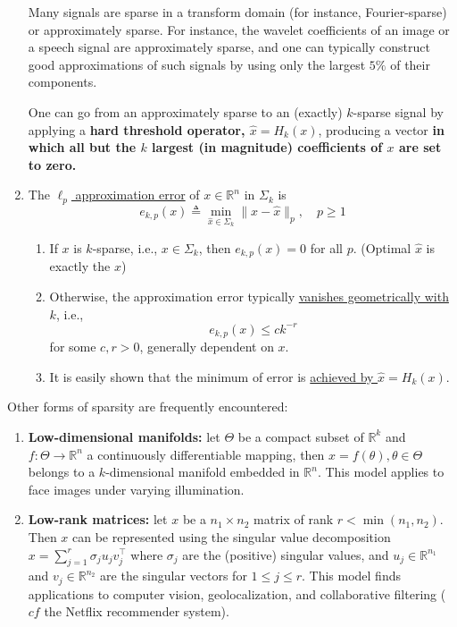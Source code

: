 \documentclass[11pt]{elegantbook}
\begin{document}
\begin{enumerate}
    Many signals are sparse in a transform domain (for instance, Fourier-sparse) or approximately sparse. For instance, the wavelet coefficients of an image or a speech signal are approximately sparse, and one can typically construct good approximations of such signals by using only the largest $5 \%$ of their components.
    \begin{claim}
        One can go from an approximately sparse to an (exactly) $k$-sparse signal by applying a \textbf{hard threshold operator, $\hat{x}=H_k(x)$}, producing a vector \textbf{in which all but the $k$ largest (in magnitude) coefficients of $x$ are set to zero.}
    \end{claim}
    \item 
    \begin{definition}
        The \underline{$\ell_p$ approximation error} of $x \in \mathbb{R}^n$ in $\Sigma_k$ is
        $$
        e_{k, p}(x) \triangleq \min _{\hat{x} \in \Sigma_k}\|x-\hat{x}\|_p, \quad p \geq 1
        $$
    \end{definition}
    \begin{lemma}[Properties]
    \begin{enumerate}
        \item If $x$ is $k$-sparse, i.e., $x \in \Sigma_k$, then $e_{k, p}(x)=0$ for all $p$. (Optimal $\hat{x}$ is exactly the $x$)
        \item Otherwise, the approximation error typically \underline{vanishes geometrically with $k$}, i.e.,
        $$
        e_{k, p}(x) \leq c k^{-r}
        $$
        for some $c, r>0$, generally dependent on $x$.
        \item It is easily shown that the minimum of error is \underline{achieved by $\hat{x}=H_k(x)$}.
    \end{enumerate}
    \end{lemma}
\end{enumerate}

Other forms of sparsity are frequently encountered:
\begin{enumerate}[$\bullet$]
    \item \textbf{Low-dimensional manifolds:} let $\Theta$ be a compact subset of $\mathbb{R}^k$ and $f: \Theta \rightarrow \mathbb{R}^n$ a continuously differentiable mapping, then $x=f(\theta), \theta \in \Theta$ belongs to a $k$-dimensional manifold embedded in $\mathbb{R}^n$. This model applies to face images under varying illumination.
    \item \textbf{Low-rank matrices:} let $x$ be a $n_1 \times n_2$ matrix of rank $r<\min \left(n_1, n_2\right)$. Then $x$ can be represented using the singular value decomposition $x=\sum_{j=1}^r \sigma_j u_j v_j^{\top}$ where $\sigma_j$ are the (positive) singular values, and $u_j \in \mathbb{R}^{n_1}$ and $v_j \in \mathbb{R}^{n_2}$ are the singular vectors for $1 \leq j \leq r$. This model finds applications to computer vision, geolocalization, and collaborative filtering ( $c f$ the Netflix recommender system).
\end{enumerate}
\end{document}
